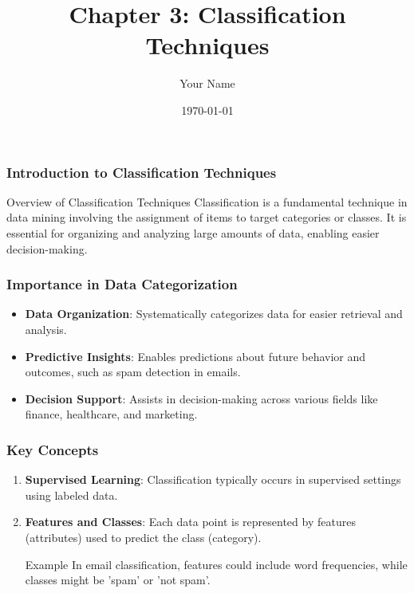 \documentclass{beamer}
\title{Chapter 3: Classification Techniques}
\author{Your Name}
\institute{Your Institution}
\date{\today}
\begin{document}
\frame{\titlepage}

\begin{frame}[fragile]
    \frametitle{Introduction to Classification Techniques}
    \begin{block}{Overview of Classification Techniques}
        Classification is a fundamental technique in data mining involving the assignment of items to target categories or classes.
        It is essential for organizing and analyzing large amounts of data, enabling easier decision-making.
    \end{block}
\end{frame}

\begin{frame}[fragile]
    \frametitle{Importance in Data Categorization}
    \begin{itemize}
        \item \textbf{Data Organization}: Systematically categorizes data for easier retrieval and analysis.
        \item \textbf{Predictive Insights}: Enables predictions about future behavior and outcomes, such as spam detection in emails.
        \item \textbf{Decision Support}: Assists in decision-making across various fields like finance, healthcare, and marketing.
    \end{itemize}
\end{frame}

\begin{frame}[fragile]
    \frametitle{Key Concepts}
    \begin{enumerate}
        \item \textbf{Supervised Learning}: Classification typically occurs in supervised settings using labeled data.
        \item \textbf{Features and Classes}: Each data point is represented by features (attributes) used to predict the class (category).
            \begin{block}{Example}
                In email classification, features could include word frequencies, while classes might be 'spam' or 'not spam'.
            \end{block}
    \end{enumerate}
\end{frame}
\end{document}
